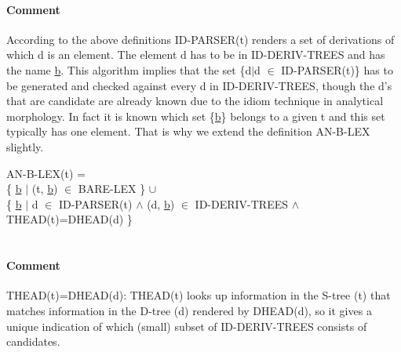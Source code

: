 \paragraph{Comment}
According to the above definitions ID-PARSER(t) renders a set of derivations of
which d is an element. The element d has to be in ID-DERIV-TREES and has the
name \underline{b}. This algorithm implies that the set \{d$|$d $\in$
ID-PARSER(t)\} has to be generated and checked against every d in
ID-DERIV-TREES, though the d's that are candidate are already known due to the
idiom technique in analytical morphology. In fact it is known which set
\{\underline{b}\} belongs to a given t and this set typically has one element.
That is why we extend the definition AN-B-LEX slightly. \newline 


AN-B-LEX(t) =\\

\{ \underline{b} $|$ (t, \underline{b}) $\in$ BARE-LEX \} $\cup$\\

\{ \underline{b} $|$ d $\in$ ID-PARSER(t) 
      $\wedge$ (d,  \underline{b}) $\in$ ID-DERIV-TREES $\wedge$\\

THEAD(t)=DHEAD(d) \}\\\\

\paragraph{Comment}
THEAD(t)=DHEAD(d): THEAD(t) looks up information in the S-tree (t) that 
matches information in the D-tree (d) rendered by DHEAD(d), so it gives a 
unique indication of which (small) subset of ID-DERIV-TREES consists of
candidates. 



